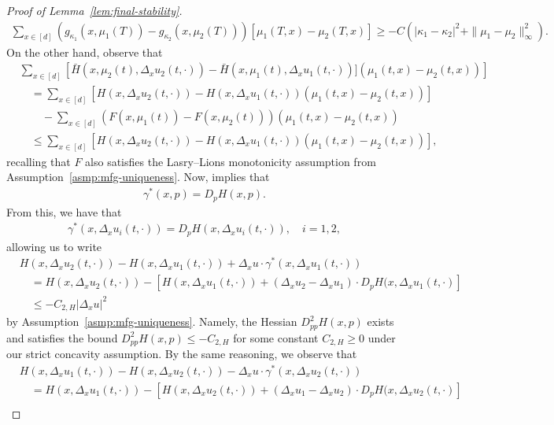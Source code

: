 \documentclass[11pt,reqno]{amsart}
\numberwithin{equation}{section}
\theoremstyle{plain}
\newcommand{\1}{\boldsymbol{\mathbbm{1}}}
\begin{document}
\begin{proof}[Proof of Lemma~\ref{lem:final-stability}]
\begin{align*}
    \sum_{x \in [d]} (g_{\kappa_1}(x,\mu_1 (T)) - g_{\kappa_2}(x, \mu_2(T)))[\mu_1(T, x) - \mu_2(T, x)] \geq -C(|\kappa_1 - \kappa_2|^2 + \|\mu_1 - \mu_2\|_\infty^2).
\end{align*}
On the other hand, observe that
\begin{align*}
    &\sum_{x \in [d]}\left[\bar H(x, \mu_2(t), \Delta_x u_2 (t,\cdot)) - \bar H(x, \mu_1(t), \Delta_x u_1 (t,\cdot))](\mu_1(t, x) - \mu_2(t, x))\right] \\
    &\quad = \sum_{x \in [d]} [H(x, \Delta_x u_2 (t,\cdot)) - H(x, \Delta_x u_1 (t,\cdot))(\mu_1(t, x) - \mu_2(t, x))] \\
    &\qquad - \sum_{x \in [d]} (F(x, \mu_1(t)) - F(x, \mu_2(t)))(\mu_1(t, x) - \mu_2(t, x)) \\
    &\quad \leq \sum_{x \in [d]} [H(x, \Delta_x u_2 (t,\cdot)) - H(x, \Delta_x u_1 (t,\cdot))(\mu_1(t, x) - \mu_2(t, x))],
\end{align*}
recalling that $F$ also satisfies the Lasry--Lions monotonicity assumption from Assumption~\ref{asmp:mfg-uniqueness}. Now, \cite[Proposition~1]{Gomes2013} implies that
\begin{align}\label{eqn:DH}
    \gamma^*(x,p) = D_p H(x,p).
\end{align}
From this, we have that
\begin{align*}
    \gamma^*(x, \Delta_x u_i(t, \cdot)) = D_p H(x, \Delta_x u_i(t, \cdot)), \quad i = 1, 2,
\end{align*}
allowing us to write
\begin{align*}
    &H(x, \Delta_x u_2 (t,\cdot)) - H(x, \Delta_x u_1(t, \cdot)) + \Delta_x u \cdot \gamma^*(x, \Delta_x u_1(t, \cdot)) \\
    &\quad = H(x, \Delta_x u_2 (t,\cdot)) - [H(x, \Delta_x u_1(t, \cdot)) + (\Delta_x u_2 - \Delta_x u_1) \cdot D_p H(x, \Delta_x u_1(t, \cdot)] \\
    &\quad \leq -C_{2, H} |\Delta_x u|^2
\end{align*}
by Assumption~\eqref{asmp:mfg-uniqueness}. Namely, the Hessian $D_{pp}^2 H(x, p)$ exists and satisfies the bound $D_{pp}^2 H(x, p) \leq -C_{2, H}$ for some constant $C_{2, H} \geq 0$ under our strict concavity assumption. By the same reasoning, we observe that 
\begin{align*}
    &H(x, \Delta_x u_1 (t,\cdot)) - H(x, \Delta_x u_2(t, \cdot)) - \Delta_x u \cdot \gamma^*(x, \Delta_x u_2(t, \cdot)) \\
    &\quad = H(x, \Delta_x u_1 (t,\cdot)) - [H(x, \Delta_x u_2(t, \cdot)) + (\Delta_x u_1 - \Delta_x u_2) \cdot D_p H(x, \Delta_x u_2(t, \cdot)] \\

\end{align*}
\end{proof}
\end{document}
